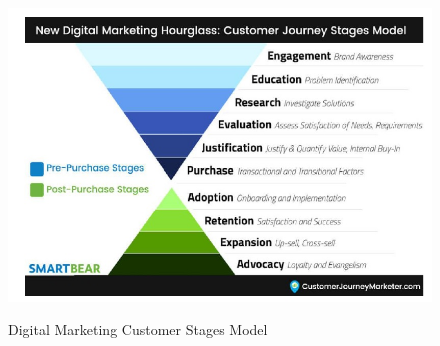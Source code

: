 \documentclass[sigconf]{acmart}
\begin{document}
\begin{figure}[ht!]
  \centering\includegraphics[width=\columnwidth]{digitalmarketing.jpg}
  \caption{Digital Marketing Customer Stages Model}\cite{DeAsi2017}\label{f:Digital Marketing}
\end{figure}
\end{document}
